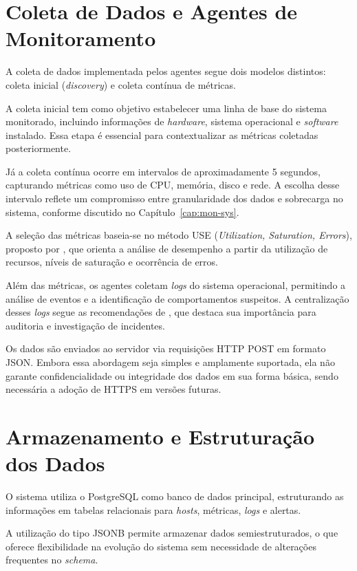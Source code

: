 \documentclass[
    12pt
    ,oneside
    ,a4paper
    ,chapter=TITLE
    ,section=TITLE
    ,sumario=abnt-6027-2012]{abntex2}
\begin{document}
\section{Coleta de Dados e Agentes de Monitoramento}

A coleta de dados implementada pelos agentes segue dois modelos distintos: coleta inicial (\textit{discovery}) e coleta contínua de métricas.

A coleta inicial tem como objetivo estabelecer uma linha de base do sistema monitorado, incluindo informações de \textit{hardware}, sistema operacional e \textit{software} instalado. Essa etapa é essencial para contextualizar as métricas coletadas posteriormente.

Já a coleta contínua ocorre em intervalos de aproximadamente 5 segundos, capturando métricas como uso de CPU, memória, disco e rede. A escolha desse intervalo reflete um compromisso entre granularidade dos dados e sobrecarga no sistema, conforme discutido no Capítulo~\ref{cap:mon-sys}.

A seleção das métricas baseia-se no método USE (\textit{Utilization, Saturation, Errors}), proposto por , que orienta a análise de desempenho a partir da utilização de recursos, níveis de saturação e ocorrência de erros.

Além das métricas, os agentes coletam \textit{logs} do sistema operacional, permitindo a análise de eventos e a identificação de comportamentos suspeitos. A centralização desses \textit{logs} segue as recomendações de , que destaca sua importância para auditoria e investigação de incidentes.

Os dados são enviados ao servidor via requisições HTTP POST em formato JSON. Embora essa abordagem seja simples e amplamente suportada, ela não garante confidencialidade ou integridade dos dados em sua forma básica, sendo necessária a adoção de HTTPS em versões futuras.

\section{Armazenamento e Estruturação dos Dados}

O sistema utiliza o PostgreSQL como banco de dados principal, estruturando as informações em tabelas relacionais para \textit{hosts}, métricas, \textit{logs} e alertas.

A utilização do tipo JSONB permite armazenar dados semiestruturados, o que oferece flexibilidade na evolução do sistema sem necessidade de alterações frequentes no \textit{schema}.
\end{document}
